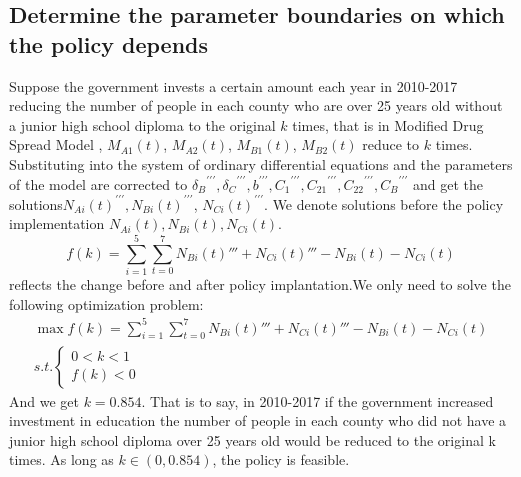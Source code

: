 \documentclass{mcmthesis}
\begin{document}
\subsection{Determine the parameter boundaries on which the policy depends}
Suppose the government invests a certain amount each year in 2010-2017 reducing the number of people in each county who are over 25 years old without a junior high school diploma to the original $k$ times, that is in Modified Drug Spread Model , 
${M_{A1}}(t)$, ${M_{A2}}(t)$, ${M_{B1}}(t)$, ${M_{B2}}(t)$ reduce to $k$ times. Substituting into the system of ordinary differential equations and the parameters of the  model are corrected 
to ${\delta _B}^{\prime \prime \prime },{\delta _C}^{\prime \prime \prime },{b^{\prime \prime \prime }},{C_1}^{\prime \prime \prime },{C_{21}}^{\prime \prime \prime },{C_{22}}^{\prime \prime \prime },{C_B}^{\prime \prime \prime }$ 
and get the solutions${N_{Ai}}{(t)^{\prime \prime \prime }},{N_{Bi}}{(t)^{\prime \prime \prime }}$,
${N_{Ci}}{(t)^{\prime \prime \prime }}$. We denote solutions before the policy implementation ${N_{Ai}}(t), {N_{Bi}}(t),{N_{Ci}}(t)$.
\begin{equation}
	f(k) = \sum\limits_{i = 1}^5 {\sum\limits_{t = 0}^7 {{N_{Bi}}(t)''' + {N_{Ci}}(t)''' - } {N_{Bi}}(t) - {N_{Ci}}(t)} 
\end{equation} 
reflects the change before and after policy implantation.We only need to solve the following optimization problem:
\begin{equation}\begin{array}{l}
\max f(k) = \sum\limits_{i = 1}^5 {\sum\limits_{t = 0}^7 {{N_{Bi}}(t)''' + {N_{Ci}}(t)''' - } {N_{Bi}}(t) - {N_{Ci}}(t)} \\
s.t.\left\{ \begin{array}{l}
0 < k < 1\\
f(k) < 0
\end{array} \right.
\end{array}\end{equation}
And we get $k=0.854$. That is to say, in 2010-2017 if the government increased investment in education the number of people in each county who did not have a junior high school diploma over 25 years old would be reduced to the original k times. As long as $k \in (0,0.854)$,  the policy is feasible.


\newpage
\end{document}
